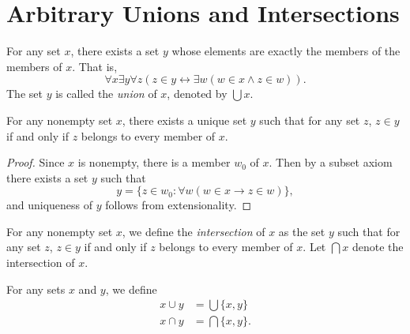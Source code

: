 \section{Arbitrary Unions and Intersections}
\begin{axiom}[Union]
  For any set $x$, there exists a set $y$ whose elements are exactly the
  members of the members of $x$.
  That is,
  \begin{equation*}
    \forall x \exists y \forall z
    (z \in y \leftrightarrow \exists w (w \in x \wedge z \in w)).
  \end{equation*}
  The set $y$ is called the \emph{union} of $x$, denoted by $\bigcup x$.
\end{axiom}

\begin{theorem}
  For any nonempty set $x$, there exists a unique set $y$ such that for any
  set $z$, $z \in y$ if and only if $z$ belongs to every member of $x$.
\end{theorem}
\begin{proof}
  Since $x$ is nonempty, there is a member $w_0$ of $x$.
  Then by a subset axiom there exists a set $y$ such that
  \begin{equation*}
    y = \{z \in w_0: \forall w (w \in x \to z \in w)\},
  \end{equation*}
  and uniqueness of $y$ follows from extensionality.
\end{proof}

\begin{definition}
  For any nonempty set $x$, we define the \emph{intersection} of $x$ as the set
  $y$ such that for any set $z$, $z \in y$ if and only if $z$ belongs to every
  member of $x$.
  Let $\bigcap x$ denote the intersection of $x$.
\end{definition}

\begin{definition}
  For any sets $x$ and $y$, we define
  \begin{align*}
    x \cup y &= \bigcup \{x, y\} \\
    x \cap y &= \bigcap \{x, y\}.
  \end{align*}
\end{definition}